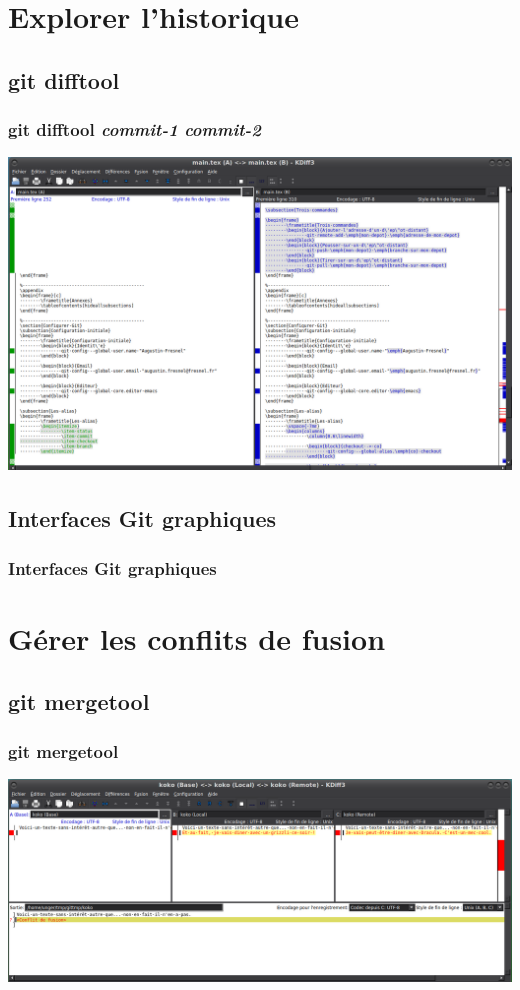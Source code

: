 \documentclass[t,11pt]{beamer}
\begin{document}
\section{Explorer l'historique}
\subsection{git difftool}
\begin{frame}
        \frametitle{git difftool \emph{commit-1} \emph{commit-2}}
        \centering
        \includegraphics[width=\linewidth,height=0.8\textheight,keepaspectratio]{./img/git-difftool-kdiff3.png}
\end{frame}

\subsection{Interfaces Git graphiques}
\begin{frame}
        \frametitle{Interfaces Git graphiques}
\end{frame}


\section{G\'erer les conflits de fusion}
\subsection{git mergetool}
\begin{frame}
        \frametitle{git mergetool}
        \centering
        \vspace{8mm}
        \includegraphics[width=\linewidth,height=\textheight,keepaspectratio]{./img/git-mergetool-kdiff3.png}
\end{frame}
\end{document}
